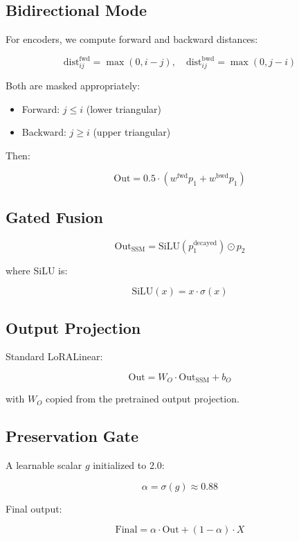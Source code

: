 \subsection{Bidirectional Mode}

For encoders, we compute forward and backward distances:

\[
\text{dist}^\text{fwd}_{ij} = \max(0, i - j), \quad
\text{dist}^\text{bwd}_{ij} = \max(0, j - i)
\tag{4.8}
\]

Both are masked appropriately:

\begin{itemize}
\item Forward: $j \leq i$ (lower triangular)
\item Backward: $j \geq i$ (upper triangular)

\end{itemize}
Then:

\[
\text{Out} = 0.5 \cdot (w^\text{fwd} p_1 + w^\text{bwd} p_1)
\tag{4.9}
\]

\subsection{Gated Fusion}

\[
\text{Out}_\text{SSM} = \text{SiLU}(p_1^\text{decayed}) \odot p_2
\tag{4.10}
\]

where SiLU is:

\[
\text{SiLU}(x) = x \cdot \sigma(x)
\tag{4.11}
\]

\subsection{Output Projection}

Standard LoRALinear:

\[
\text{Out} = W_O \cdot \text{Out}_\text{SSM} + b_O
\tag{4.12}
\]

with $W_O$ copied from the pretrained output projection.

\subsection{Preservation Gate}

A learnable scalar $g$ initialized to 2.0:

\[
\alpha = \sigma(g) \approx 0.88
\tag{4.13}
\]

Final output:

\[
\text{Final} = \alpha \cdot \text{Out} + (1 - \alpha) \cdot X
\tag{4.14}
\]

